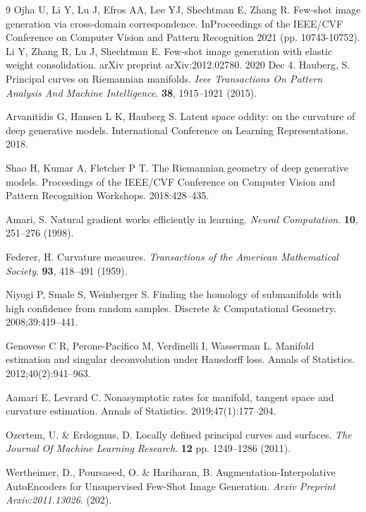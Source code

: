 \documentclass{article}
\begin{document}
\newpage
\begin{thebibliography}{9}
Ojha U, Li Y, Lu J, Efros AA, Lee YJ, Shechtman E, Zhang R. Few-shot image generation via cross-domain correspondence. InProceedings of the IEEE/CVF Conference on Computer Vision and Pattern Recognition 2021 (pp. 10743-10752).
Li Y, Zhang R, Lu J, Shechtman E. Few-shot image generation with elastic weight consolidation. arXiv preprint arXiv:2012.02780. 2020 Dec 4.
Hauberg, S. Principal curves on Riemannian manifolds. 
{\em Ieee Transactions On Pattern Analysis And Machine Intelligence}.
 \textbf{38}, 1915--1921 (2015).

Arvanitidis G, Hansen L K, Hauberg S. Latent space oddity: on the curvature of deep generative models. International Conference on Learning Representations. 2018.

Shao H, Kumar A, Fletcher P T. The Riemannian geometry of deep generative models. Proceedings of the IEEE/CVF Conference on Computer Vision and Pattern Recognition Workshops. 2018:428--435.

Amari, S. Natural gradient works efficiently in learning.
{\em Neural Computation}.
\textbf{10}, 251--276 (1998).

Federer, H. Curvature measures.
{\em Transactions of the American Mathematical Society}.
\textbf{93}, 418--491 (1959).

Niyogi P, Smale S, Weinberger S. Finding the homology of submanifolds with high confidence from random samples. Discrete \& Computational Geometry. 2008;39:419--441.

Genovese C R, Perone-Pacifico M, Verdinelli I, Wasserman L. Manifold estimation and singular deconvolution under Hausdorff loss. Annals of Statistics. 2012;40(2):941--963.

Aamari E, Levrard C. Nonasymptotic rates for manifold, tangent space and curvature estimation. Annals of Statistics. 2019;47(1):177--204.

Ozertem, U. \& Erdogmus, D. Locally defined principal curves and surfaces. 
{\em The Journal Of Machine Learning Research}.
 \textbf{12} pp. 1249--1286 (2011).

Wertheimer, D., Poursaeed, O. \& Hariharan, B. Augmentation-Interpolative AutoEncoders for Unsupervised Few-Shot Image Generation. 
{\em Arxiv Preprint Arxiv:2011.13026}.
 (202).
 

\end{thebibliography}
\end{document}
